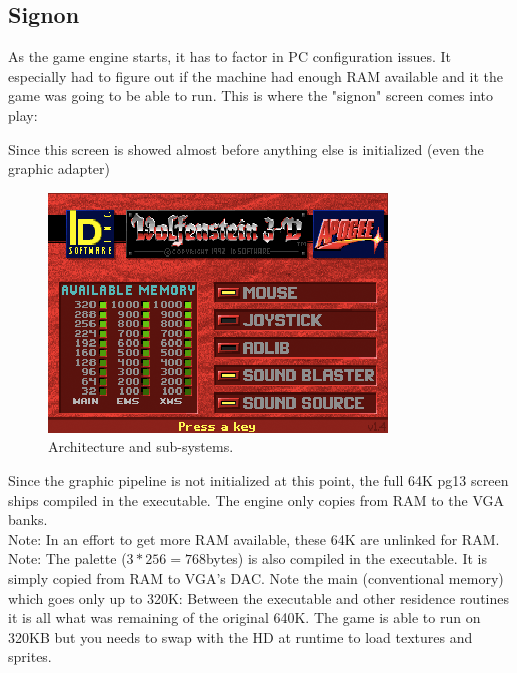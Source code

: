\documentclass[book.tex]{subfiles}
\begin{document}
\subsection{Signon}
As the game engine starts, it has to factor in PC configuration issues. It especially had to figure out if the machine had enough RAM available and it the game was going to be able to run. This is where the "signon" screen comes into play:
\par 
\begin{minipage}{\textwidth}

\end{minipage}
Since this screen is showed almost before anything else is initialized (even the graphic adapter)
\begin{figure}[H]
\centering
\includegraphics[width=\textwidth]{screenshots/signon.png}
\caption{Architecture and sub-systems.}
\end{figure}
Since the graphic pipeline is not initialized at this point, the full 64K pg13 screen ships compiled in the executable. The engine only copies from RAM to the VGA banks.\\

Note: In an effort to get more RAM available, these 64K are unlinked for RAM.\\
Note: The palette ($3*256=768$bytes) is also compiled in the executable. It is simply copied from RAM to VGA's DAC.
Note the main (conventional memory) which goes only up to 320K: Between the executable and other residence routines it is all what was remaining of the original 640K. The game is able to run on 320KB but you needs to swap with the HD at runtime to load textures and sprites.
\end{document}
